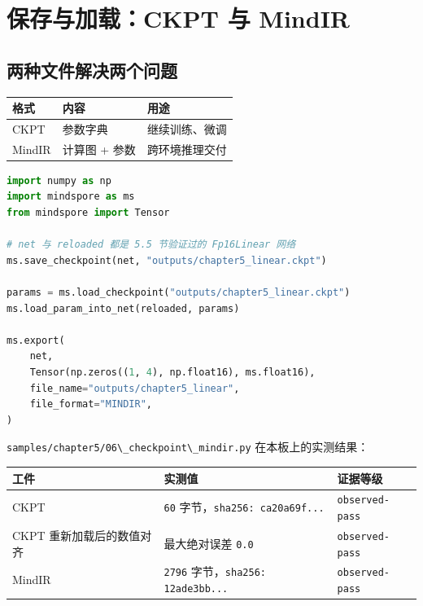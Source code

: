 \section{保存与加载：CKPT 与 MindIR}\label{src-book-chapter5-h22}

\subsection{两种文件解决两个问题}\label{src-book-chapter5-h23}

\begin{longtable}[]{@{}lll@{}}
\toprule\noalign{}
格式 & 内容 & 用途 \\
\midrule\noalign{}
\endhead
\bottomrule\noalign{}
\endlastfoot
CKPT & 参数字典 & 继续训练、微调 \\
MindIR & 计算图 + 参数 & 跨环境推理交付 \\
\end{longtable}

\begin{lstlisting}[language=Python]
import numpy as np
import mindspore as ms
from mindspore import Tensor

# net 与 reloaded 都是 5.5 节验证过的 Fp16Linear 网络
ms.save_checkpoint(net, "outputs/chapter5_linear.ckpt")

params = ms.load_checkpoint("outputs/chapter5_linear.ckpt")
ms.load_param_into_net(reloaded, params)

ms.export(
    net,
    Tensor(np.zeros((1, 4), np.float16), ms.float16),
    file_name="outputs/chapter5_linear",
    file_format="MINDIR",
)
\end{lstlisting}

\passthrough{\lstinline!samples/chapter5/06\_checkpoint\_mindir.py!}
在本板上的实测结果：

\begin{longtable}[]{@{}lll@{}}
\toprule\noalign{}
工件 & 实测值 & 证据等级 \\
\midrule\noalign{}
\endhead
\bottomrule\noalign{}
\endlastfoot
CKPT & \passthrough{\lstinline!60!}
字节，\passthrough{\lstinline!sha256: ca20a69f...!} &
\passthrough{\lstinline!observed-pass!} \\
CKPT 重新加载后的数值对齐 & 最大绝对误差 \passthrough{\lstinline!0.0!} &
\passthrough{\lstinline!observed-pass!} \\
MindIR & \passthrough{\lstinline!2796!}
字节，\passthrough{\lstinline!sha256: 12ade3bb...!} &
\passthrough{\lstinline!observed-pass!} \\
\end{longtable}

